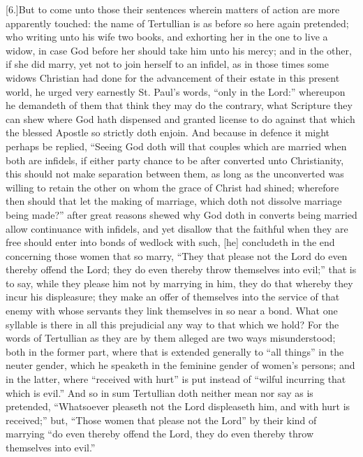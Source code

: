 [6.]But to come unto those their sentences wherein matters of action are more apparently touched: the name of Tertullian is as before so here again pretended; who writing unto his wife two books, and exhorting her in the one to live a widow, in case God before her should take him unto his mercy; and in the other, if she did marry, yet not to join herself to an infidel, as in those times some widows Christian had done for the advancement of their estate in this present world, he urged very earnestly St. Paul’s words, “only in the Lord:”  whereupon he demandeth of them that think they may do the contrary, what Scripture they can shew where God hath dispensed and granted license to do against that which the blessed Apostle so strictly doth enjoin. And because in defence it might perhaps be replied, “Seeing God doth will that couples which are married when both are infidels, if either party chance to be after converted unto Christianity, this should not make separation between them, as long as the unconverted was willing to retain the other on whom the grace of Christ had shined; wherefore then should that let the making of marriage, which doth not dissolve marriage being made?” after great reasons shewed why God doth in converts being married allow continuance with infidels, and yet disallow that the faithful when they are free should enter into bonds of wedlock with such, [he] concludeth in the end concerning those women that so marry, “They that please not the Lord do even thereby offend the Lord; they do even thereby throw themselves into evil;” that is to say, while they please him not by marrying in him, they do that whereby they incur his displeasure; they make an offer of themselves into the service of that enemy with whose servants they link themselves in so near a bond. What one syllable is there in all this prejudicial any way to that which we hold? For the words of Tertullian as they are by them alleged are two ways misunderstood; both in the former part, where that is extended generally to “all things” in the neuter gender, which he speaketh in the feminine gender of women’s persons; and in the latter, where “received with hurt” is put instead of “wilful incurring that which is evil.” And so in sum Tertullian doth neither mean nor say as is pretended, “Whatsoever pleaseth not the Lord displeaseth him, and with hurt is received;” but, “Those women that please not the Lord” by their kind of marrying “do even thereby offend the Lord, they do even thereby throw themselves into evil.”


